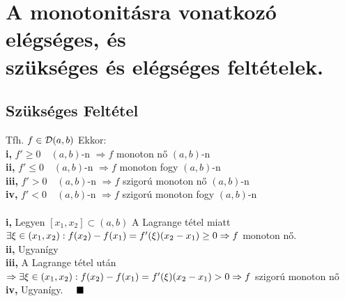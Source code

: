 \documentclass[a4paper,11pt]{article}
\begin{document}
\section{A monotonitásra vonatkozó elégséges, és \\ szükséges és elégséges feltételek.}
\subsection{Szükséges Feltétel}
\tetel Tfh. $f\in\displaystyle\mathcal{D}(a,b)$ Ekkor: \\[0.1cm]\hspace*{0.3cm}\textbf{i,} $f'\geq0\quad(a,b)$-n
$\Rightarrow f$ monoton nő $(a,b)$-n\\[0.1cm]\hspace*{0.3cm}\textbf{ii,}
$f'\leq0\quad(a,b)$-n $\Rightarrow f$ monoton fogy $(a,b)$-n\\[0.1cm]
\hspace*{0.3cm}\textbf{iii,} $f'>0\quad (a,b)$-n $\Rightarrow f$ szigorú monoton nő
$(a,b)$-n\\[0.1cm]\hspace*{0.3cm}\textbf{iv,} $f'<0\quad (a,b)$-n $\Rightarrow f$
szigorú monoton fogy $(a,b)$-n\\[0.2cm]\biz \\[0.1cm]\textbf{i,} Legyen
$[x_1,x_2]\subset(a,b)$ A Lagrange tétel miatt $\exists\xi\in
(x_1,x_2):\\[0.2cm]f(x_2)-f(x_1)=f'(\xi)(x_2-x_1)\geq0\Rightarrow f$ monoton
nő.\\[0.1cm]\textbf{ii,} Ugyanígy\\[0.1cm]\textbf{iii,} A Lagrange tétel után
$\Rightarrow\exists\xi\in (x_1,x_2):\\[0.2cm]f(x_2)-f(x_1)=f'(\xi)(x_2-x_1)>0
\Rightarrow f$ szigorú monoton nő\\[0.1cm]\textbf{iv,} Ugyanígy. $\quad\blacksquare$
\end{document}
